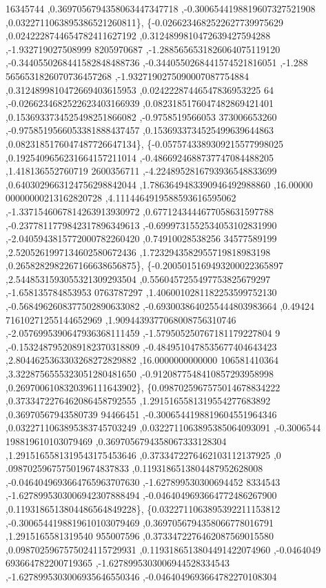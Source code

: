 \begin{DoxyCode}
      16345744 ,0.3697056794358063447347718 ,-0.3006544198819607327521908 ,0.0322711063895386521260811\},
\{-0.0266234682522627739975629 ,0.0242228744654782411627192 ,0.3124899810472639427594288 ,-1.932719027508999
      8205970687 ,-1.2885656531826064075119120 ,-0.3440550268441582848488736 ,-0.3440550268441574521816051 ,-1.288
      5656531826070736457268 ,-1.9327190275090007087754884 ,0.3124899810472669403615953 ,0.02422287446547836953225
      64 ,-0.0266234682522623403166939 ,0.0823185176047482869421401 ,0.1536933734525498251866082 ,-0.9758519566053
      373006653260 ,-0.9758519566053381888437457 ,0.1536933734525499639644863 ,0.0823185176047487726647134\},
\{-0.0575743389309215577998025 ,0.1925409656231664157211014 ,-0.4866924688737747084488205 ,1.418136552760719
      2600356711 ,-4.2248952816793936548833699 ,0.6403029663124756298842044 ,1.7863649483390946492988860 ,16.00000
      00000000213162820728 ,4.1114464919588593616595062 ,-1.3371546067814263913930972 ,0.6771243444677058631597788
       ,-0.2377811779842317896349613 ,-0.6999731552534053102831990 ,-2.0405943815772000782260420 ,0.74910028538256
      34577589199 ,2.5205261997134602580672436 ,1.7232943582955719818983198 ,0.2658282982267166638656875\},
\{-0.2005015169493200022365897 ,2.5448531593055321309293504 ,0.5560457255497753825679297 ,-1.658135784853953
      0763787297 ,1.4060010281182253599752130 ,-0.5684962608377502890633082 ,-0.6930038640255444803983664 ,0.49424
      71610271255144652969 ,1.9094439377068008756310746 ,-2.0576995390647936368111459 ,-1.579505250767181179227804
      9 ,-0.1532487952089182370318809 ,-0.4849510478535677404643423 ,2.8044625363303268272829882 ,16.0000000000000
      106581410364 ,3.3228756555323051280481650 ,-0.9120877548410857293958998 ,0.2697006108320396111643902\},
\{0.0987025967575014678834222 ,0.3733472276462086458792555 ,1.2915165581319554277683892 ,0.36970567943580739
      94466451 ,-0.3006544198819604551964346 ,0.0322711063895383745703249 ,0.0322711063895385064093091 ,-0.3006544
      198819610103079469 ,0.3697056794358067333128304 ,1.2915165581319543175453646 ,0.3733472276462103112137925 ,0
      .0987025967575019674837833 ,0.1193186513804487952628008 ,-0.0464049693664765963707630 ,-1.627899530300694452
      8334543 ,-1.6278995303006942307888494 ,-0.0464049693664772486267900 ,0.1193186513804486564849228\},
\{0.0322711063895392211153812 ,-0.3006544198819610103079469 ,0.3697056794358066778016791 ,1.2915165581319540
      955007596 ,0.3733472276462087569015580 ,0.0987025967575024115729931 ,0.1193186513804491422074960 ,-0.0464049
      693664782200719365 ,-1.6278995303006944528334543 ,-1.6278995303006935646550346 ,-0.0464049693664782270108304

\end{DoxyCode}
